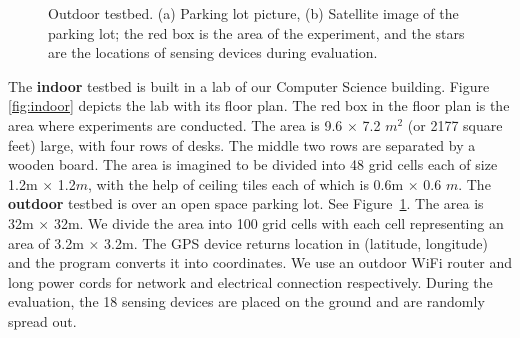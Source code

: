 \begin{figure}
	\centering
	\qquad
	\hspace{-0.15in}
	\caption{Outdoor testbed. (a) Parking lot picture, (b)
          Satellite image of the parking lot; the red box is the area
          of the experiment, and the stars are the locations of
          sensing devices during evaluation.}
	\label{fig:outdoor}
\end{figure}

 The {\bf indoor} testbed is built in a lab of our
Computer Science building.  Figure \ref{fig:indoor} depicts the lab
with its floor plan. The red box in the floor plan is the area where
experiments are conducted. The area is 9.6 $\times$ 7.2 $m^2$ (or 2177
square feet) large, with four rows of desks. The middle two rows
are separated by a wooden board. The area is imagined to be divided
into 48 grid cells each of size 1.2m $\times$ 1.2$m$, with the help of
ceiling tiles each of which is 0.6m $\times$ 0.6 $m$. 
The {\bf outdoor} testbed is over an open space parking lot.  See
Figure~\ref{fig:outdoor}. The area is 32m $\times$ 32m. We divide the
area into 100 grid cells with each cell representing an area of 3.2m
$\times$ 3.2m. The GPS device returns location in (latitude,
longitude) and the program converts it into coordinates. We use an
outdoor WiFi router and long power cords for network and electrical
connection respectively.
During the evaluation, the 18 sensing devices are placed on the ground
and are randomly spread out.


